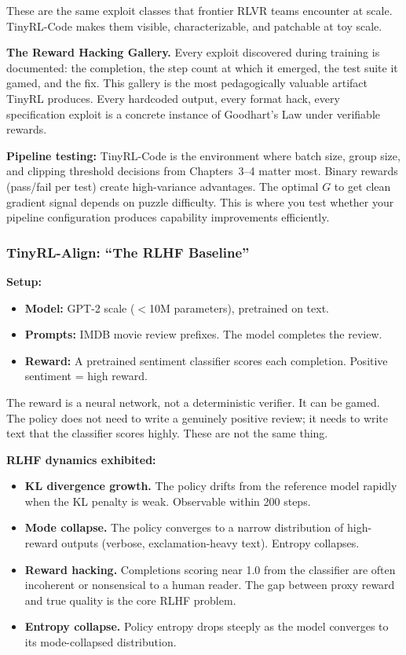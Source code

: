 These are the same exploit classes that frontier RLVR teams encounter at scale. TinyRL-Code makes them visible, characterizable, and patchable at toy scale.

\textbf{The Reward Hacking Gallery.} Every exploit discovered during training is documented: the completion, the step count at which it emerged, the test suite it gamed, and the fix. This gallery is the most pedagogically valuable artifact TinyRL produces. Every hardcoded output, every format hack, every specification exploit is a concrete instance of Goodhart's Law under verifiable rewards.

\textbf{Pipeline testing:} TinyRL-Code is the environment where batch size, group size, and clipping threshold decisions from Chapters~3--4 matter most. Binary rewards (pass/fail per test) create high-variance advantages. The optimal $G$ to get clean gradient signal depends on puzzle difficulty. This is where you test whether your pipeline configuration produces capability improvements efficiently.


\subsubsection*{TinyRL-Align: ``The RLHF Baseline''}

\textbf{Setup:}
\begin{itemize}
  \item \textbf{Model:} GPT-2 scale ($<$10M parameters), pretrained on text.
  \item \textbf{Prompts:} IMDB movie review prefixes. The model completes the review.
  \item \textbf{Reward:} A pretrained sentiment classifier scores each completion. Positive sentiment = high reward.
\end{itemize}

The reward is a neural network, not a deterministic verifier. It can be gamed. The policy does not need to write a genuinely positive review; it needs to write text that the classifier scores highly. These are not the same thing.

\textbf{RLHF dynamics exhibited:}
\begin{itemize}
  \item \textbf{KL divergence growth.} The policy drifts from the reference model rapidly when the KL penalty is weak. Observable within 200 steps.
  \item \textbf{Mode collapse.} The policy converges to a narrow distribution of high-reward outputs (verbose, exclamation-heavy text). Entropy collapses.
  \item \textbf{Reward hacking.} Completions scoring near 1.0 from the classifier are often incoherent or nonsensical to a human reader. The gap between proxy reward and true quality is the core RLHF problem.
  \item \textbf{Entropy collapse.} Policy entropy drops steeply as the model converges to its mode-collapsed distribution.
\end{itemize}

